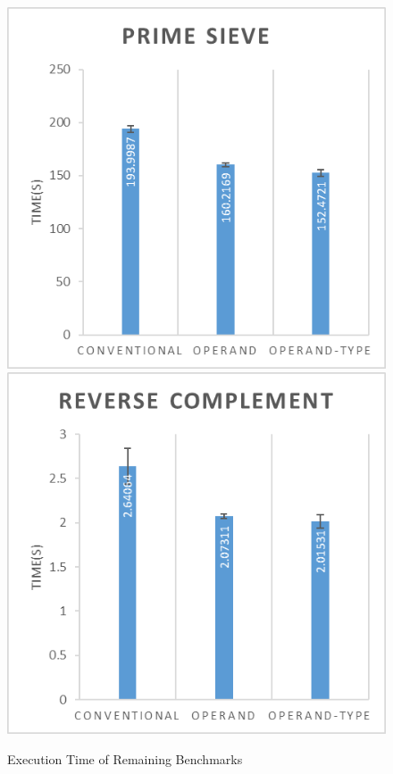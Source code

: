 \documentclass[english,a4paper,12pt]{report}
\begin{document}
\begin{figure}[!htb]
  \includegraphics{primesieve.png}
  \includegraphics{reversecomplement.png}
  \caption{Execution Time of Remaining Benchmarks}
  \label{execution-time}
\end{figure}
\end{document}
